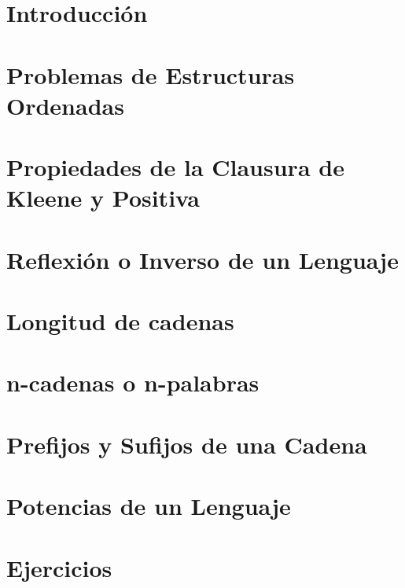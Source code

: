 \documentclass[12pt]{article}
\begin{document}
	
    \newpage
    \thispagestyle{empty}
    \setcounter{page}{1}
    
    \newpage
    \tableofcontents
    \newpage
    \thispagestyle{plain}
    \setcounter{page}{1}
    \section*{Introducción}
    
	\newpage
    \section{Problemas de Estructuras Ordenadas}
        
    \newpage
    \section{Propiedades de la Clausura de Kleene y Positiva}
        
    \newpage
    \section{Reflexión o Inverso de un Lenguaje}
        
    \newpage
    \section{Longitud de cadenas}
        
    \newpage
    \section{n-cadenas o n-palabras}
        
    \newpage
    \section{Prefijos y Sufijos de una Cadena}
        
    \newpage
    \section{Potencias de un Lenguaje}
        
    \newpage
    \section{Ejercicios}
        
\end{document}
